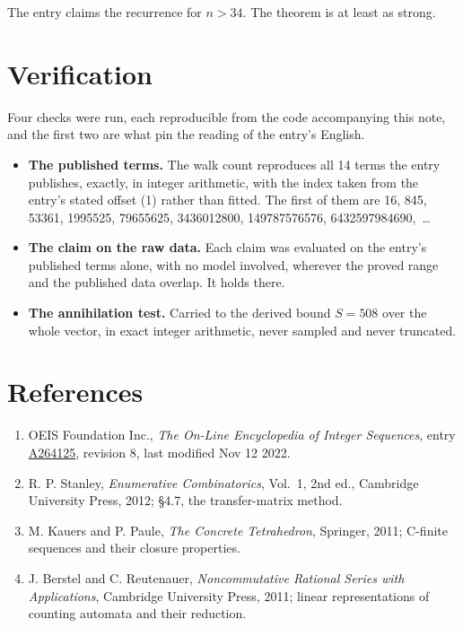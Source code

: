 \documentclass[11pt]{article}
\theoremstyle{definition}
\begin{document}
The entry claims the recurrence for $n > 34$. The theorem is at least as strong.

\section{Verification}

Four checks were run, each reproducible from the code accompanying this note, and the first two are what pin the reading of the entry's English.

\begin{itemize}

\item {\bfseries The published terms.} The walk count reproduces all 14 terms the entry publishes, exactly, in integer arithmetic, with the index taken from the entry's stated offset (1) rather than fitted. The first of them are 16, 845, 53361, 1995525, 79655625, 3436012800, 149787576576, 6432597984690,~\dots

\item {\bfseries The claim on the raw data.} Each claim was evaluated on the entry's published terms alone, with no model involved, wherever the proved range and the published data overlap. It holds there.

\item {\bfseries The annihilation test.} Carried to the derived bound $S = 508$ over the whole vector, in exact integer arithmetic, never sampled and never truncated.

\end{itemize}

\section{References}

\begin{enumerate}

\item OEIS Foundation Inc., \emph{The On-Line Encyclopedia of Integer Sequences}, entry \href{https://oeis.org/A264125}{A264125}, revision 8, last modified Nov 12 2022.

\item R. P. Stanley, \emph{Enumerative Combinatorics}, Vol.~1, 2nd ed., Cambridge University Press, 2012; \S4.7, the transfer-matrix method.

\item M. Kauers and P. Paule, \emph{The Concrete Tetrahedron}, Springer, 2011; C-finite sequences and their closure properties.

\item J. Berstel and C. Reutenauer, \emph{Noncommutative Rational Series with Applications}, Cambridge University Press, 2011; linear representations of counting automata and their reduction.

\end{enumerate}
\end{document}
